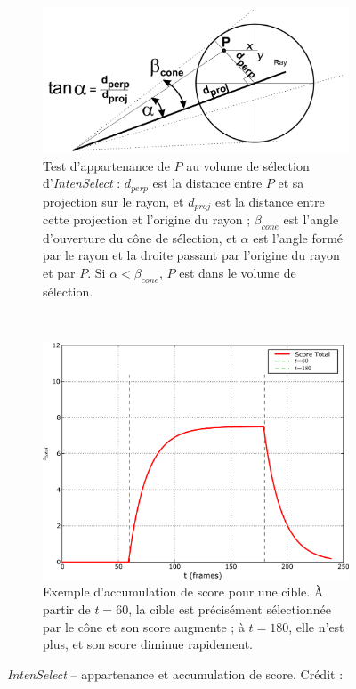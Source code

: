 	\begin{figure}[!htb]
		\begin{subfigure}[t]{0.49\textwidth}
			\centering
			\includegraphics[width=\textwidth]{figures/ch2/intensCone}
			\caption{Test d'appartenance de $P$ au volume de sélection d'\emph{IntenSelect} : $d_{perp}$ est la distance entre $P$ et sa projection sur le rayon, et $d_{proj}$ est la distance entre cette projection et l'origine du rayon ; $\beta_{cone}$ est l'angle d'ouverture du cône de sélection, et $\alpha$ est l'angle formé par le rayon et la droite passant par l'origine du rayon et par $P$. Si $\alpha < \beta_{cone}$, $P$ est dans le volume de sélection.}
			\label{fig:intensCone}
		\end{subfigure}
		~
		\begin{subfigure}[t]{0.49\textwidth}
			\centering
			\includegraphics[width=\textwidth]{figures/ch2/intensAccumul}
			\caption{Exemple d'accumulation de score pour une cible. À partir de $t = 60$, la cible est précisément sélectionnée par le cône et son score augmente ; à $t = 180$, elle n'est plus, et son score diminue rapidement.}
			\label{fig:intensAccumul}
		\end{subfigure}
		\caption[\emph{IntenSelect} -- appartenance et accumulation de score]{\emph{IntenSelect} -- appartenance et accumulation de score. Crédit : \cite{de2005intenselect}}
		\label{fig:intensConeAccumul}
	\end{figure}
	
